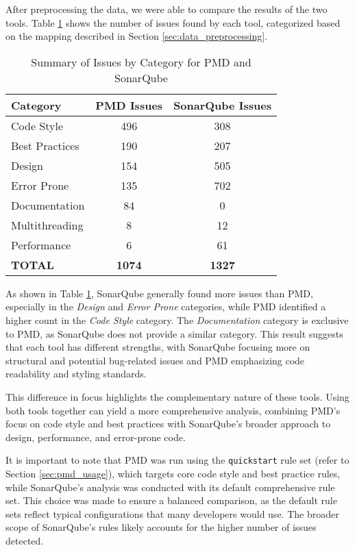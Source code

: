 After preprocessing the data, we were able to compare the results of the two tools. Table \ref{tab:sonarqube_pmd_comparison} shows the number of issues found by each tool, categorized based on the mapping described in Section \ref{sec:data_preprocessing}.

\begin{table}[H]
  \centering
  \begin{tabular}{|l|c|c|}
  \hline
  \textbf{Category} & \textbf{PMD Issues} & \textbf{SonarQube Issues} \\
  \hline
  Code Style           & 496 & 308 \\
  Best Practices       & 190 & 207 \\
  Design               & 154 & 505 \\
  Error Prone          & 135 & 702 \\
  Documentation        & 84  & 0 \\
  Multithreading       & 8   & 12 \\
  Performance          & 6   & 61 \\
  \textbf{TOTAL}       & \textbf{1074} & \textbf{1327} \\
  \hline
  \end{tabular}
  \caption{Summary of Issues by Category for PMD and SonarQube}
  \label{tab:sonarqube_pmd_comparison}
\end{table}

\noindent As shown in Table \ref{tab:sonarqube_pmd_comparison}, SonarQube generally found more issues than PMD, especially in the \textit{Design} and \textit{Error Prone} categories, while PMD identified a higher count in the \textit{Code Style} category. The \textit{Documentation} category is exclusive to PMD, as SonarQube does not provide a similar category. This result suggests that each tool has different strengths, with SonarQube focusing more on structural and potential bug-related issues and PMD emphasizing code readability and styling standards.

This difference in focus highlights the complementary nature of these tools. Using both tools together can yield a more comprehensive analysis, combining PMD's focus on code style and best practices with SonarQube's broader approach to design, performance, and error-prone code.

It is important to note that PMD was run using the \texttt{quickstart} rule set (refer to Section \ref{sec:pmd_usage}), which targets core code style and best practice rules, while SonarQube’s analysis was conducted with its default comprehensive rule set. This choice was made to ensure a balanced comparison, as the default rule sets reflect typical configurations that many developers would use. The broader scope of SonarQube’s rules likely accounts for the higher number of issues detected.

